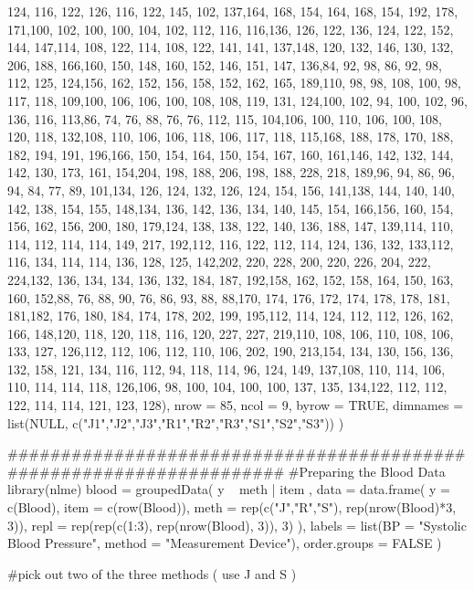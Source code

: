 124, 116, 122, 126, 116, 122, 145, 102, 137,164, 168, 154, 164, 168, 154, 192, 178, 171,100, 102, 100, 100, 104, 102, 112, 116, 116,136, 126, 122, 136, 124, 122, 152, 144, 147,114, 108, 122, 114, 108, 122, 141, 141, 137,148, 120, 132, 146, 130, 132, 206, 188, 166,160, 150, 148, 160, 152, 146, 151, 147, 136,84, 92, 98, 86, 92, 98, 112, 125, 124,156, 162, 152, 156, 158, 152, 162, 165, 189,110, 98, 98, 108, 100, 98, 117, 118, 109,100, 106, 106, 100, 108, 108, 119, 131, 124,100, 102, 94, 100, 102, 96, 136, 116, 113,86, 74, 76, 88, 76, 76, 112, 115, 104,106, 100, 110, 106, 100, 108, 120, 118, 132,108, 110, 106, 106, 118, 106, 117, 118, 115,168, 188, 178, 170, 188, 182, 194, 191, 196,166, 150, 154, 164, 150, 154, 167, 160, 161,146, 142, 132, 144, 142, 130, 173, 161, 154,204, 198, 188, 206, 198, 188, 228, 218, 189,96, 94, 86, 96, 94, 84, 77, 89, 101,134, 126, 124, 132, 126, 124, 154, 156, 141,138, 144, 140, 140, 142, 138, 154, 155, 148,134, 136, 142, 136, 134, 140, 145, 154, 166,156, 160, 154, 156, 162, 156, 200, 180, 179,124, 138, 138, 122, 140, 136, 188, 147, 139,114, 110, 114, 112, 114, 114, 149, 217, 192,112, 116, 122, 112, 114, 124, 136, 132, 133,112, 116, 134, 114, 114, 136, 128, 125, 142,202, 220, 228, 200, 220, 226, 204, 222, 224,132, 136, 134, 134, 136, 132, 184, 187, 192,158, 162, 152, 158, 164, 150, 163, 160, 152,88, 76, 88, 90, 76, 86, 93, 88, 88,170, 174, 176, 172, 174, 178, 178, 181, 181,182, 176, 180, 184, 174, 178, 202, 199, 195,112, 114, 124, 112, 112, 126, 162, 166, 148,120, 118, 120, 118, 116, 120, 227, 227, 219,110, 108, 106, 110, 108, 106, 133, 127, 126,112, 112, 106, 112, 110, 106, 202, 190, 213,154, 134, 130, 156, 136, 132, 158, 121, 134,
116, 112, 94, 118, 114, 96, 124, 149, 137,108, 110, 114, 106, 110, 114, 114, 118, 126,106, 98, 100, 104, 100, 100, 137, 135, 134,122, 112, 112, 122, 114, 114, 121, 123, 128), 
nrow = 85, ncol = 9, byrow = TRUE,
dimnames = list(NULL, c("J1","J2","J3","R1","R2","R3","S1","S2","S3")) )



#####################################################################
#Preparing the Blood Data
library(nlme)
blood = groupedData( y ~ meth | item ,
    data = data.frame( y = c(Blood), item = c(row(Blood)),
        meth = rep(c("J","R","S"), rep(nrow(Blood)*3, 3)),
        repl = rep(rep(c(1:3), rep(nrow(Blood), 3)), 3) ),
    labels = list(BP = "Systolic Blood Pressure", method = "Measurement Device"),
    order.groups = FALSE )
 
#pick out two of the three methods ( use J and S ) 
   
